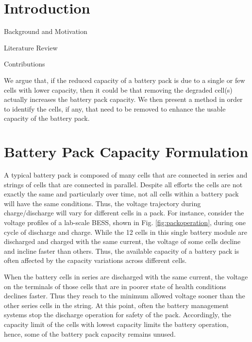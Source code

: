 \documentclass[10pt,twocolumn]{IEEEtran}
\begin{document}
\section{Introduction}

\color{red}
Background and Motivation

Literature Review

Contributions

\color{black}

We  argue that, if the reduced capacity of a battery pack is due to a single or few cells with lower capacity, then it could be that removing the degraded cell(s) actually increases the battery pack capacity. We then present a method in order to identify the cells, if any, that need to be removed to enhance the usable capacity of the battery pack.

\section{Battery Pack Capacity Formulation}

A typical battery pack is composed of many cells that are connected in series and strings of cells that are connected in parallel. 
Despite all efforts the cells are not exactly the same and particularly over time, not all cells within a battery pack will have the same conditions.
Thus, the voltage trajectory during charge/discharge will vary for different cells in a pack.
For instance, consider the voltage profiles of a lab-scale BESS,  shown in Fig. \ref{fig:packoperation}, during one cycle of discharge and charge.
While the 12 cells in this single battery module are discharged and charged with the same current, the voltage of some cells decline and incline faster than others.
Thus, the available capacity of a battery pack is often affected by the capacity variations  across different cells.


When the battery cells in series  are discharged with the same current, the voltage on the terminals of those cells that are in poorer state of health conditions  declines faster.
Thus they reach to the minimum allowed voltage sooner than the other series cells in the  string.
At this point, often the battery management systems stop the discharge operation for safety of the pack.
Accordingly, the capacity limit of the cells with lowest capacity limits the battery operation, hence, some of the battery pack capacity remains unused.
\end{document}
